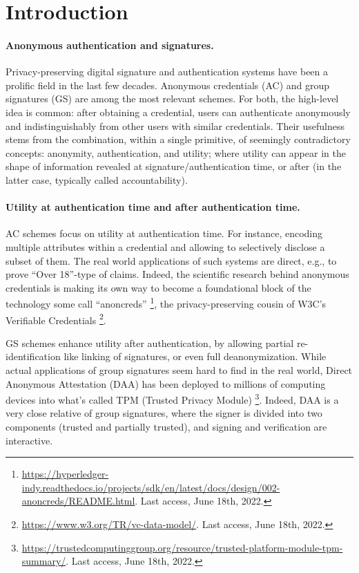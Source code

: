 \section{Introduction}
\label{sec:introduction}


\paragraph{Anonymous authentication and signatures.} %
Privacy-preserving digital signature and authentication systems have been a
prolific field in the last few decades. Anonymous credentials (AC)
\cite{chau85} and group signatures (GS) \cite{ch91} are among the most relevant
schemes. For both, the high-level idea is common: after obtaining a credential,
users can authenticate anonymously and indistinguishably from other users with
similar credentials. 
%
Their usefulness stems from the combination, within a single primitive, of
seemingly contradictory concepts: anonymity, authentication, and utility; where
utility can appear in the shape of information revealed at signature/authentication
time, or after (in the latter case, typically called accountability).

\paragraph{Utility at authentication time and after authentication time.} %
AC schemes focus on utility at authentication time. For instance, encoding
multiple attributes within a credential and allowing to selectively disclose a
subset of them. The real world applications of such systems are direct, e.g.,
to prove ``Over 18''-type of claims. Indeed, the scientific research behind
anonymous credentials is making its own way to become a foundational block of
the technology some call ``anoncreds''%
\footnote{\url{https://hyperledger-indy.readthedocs.io/projects/sdk/en/latest/docs/design/002-anoncreds/README.html}. Last access, June 18th, 2022.},
the privacy-preserving cousin of W3C's Verifiable Credentials%
\footnote{\url{https://www.w3.org/TR/vc-data-model/}. Last access, June 18th,
  2022.}.

GS schemes enhance utility after authentication, by allowing partial
re-identification like linking of signatures, or even full deanonymization.
While actual applications of group signatures seem hard to find in the real
world, Direct Anonymous Attestation (DAA) \cite{bcc04,bl07,cdl16b} has been
deployed to millions of computing devices into what's called TPM (Trusted
Privacy Module)%
\footnote{\url{https://trustedcomputinggroup.org/resource/trusted-platform-module-tpm-summary/}. Last access, June 18th, 2022.}.
Indeed, DAA is a very close relative of group signatures, where the signer is
divided into two components (trusted and partially trusted), and signing
and verification are interactive.

